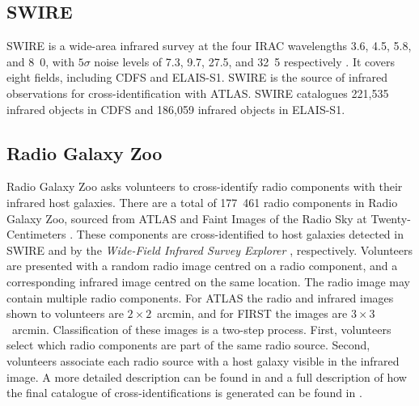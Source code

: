 \documentclass[fleqn,usenatbib,usedcolumn]{mnras}
\newcommand{\jansky}{\text{Jy}}
\begin{document}


  \subsection{SWIRE}\label{sec:swire}

    SWIRE \citep{lonsdale03swire, surace05swire} is a wide-area infrared
    survey at the four IRAC wavelengths 3.6, 4.5, 5.8, and
    \unit{8.0}{\micro\meter}, with $5\sigma$ noise levels of 7.3,
    9.7, 27.5, and \unit{32.5}{\micro\jansky} respectively
    \citep{lonsdale03swire}. It covers eight fields, including CDFS and ELAIS-S1. SWIRE is the source of infrared
    observations for cross-identification with ATLAS. SWIRE catalogues 221,535
    infrared objects in CDFS and 186,059 infrared objects in ELAIS-S1.

  \subsection{Radio Galaxy Zoo}\label{sec:rgz}

    Radio Galaxy Zoo asks volunteers to cross-identify radio components with
    their infrared host galaxies. There are a total of 177~461 radio
    components in Radio Galaxy Zoo, sourced from ATLAS and Faint Images of the
    Radio Sky at Twenty-Centimeters \citep[FIRST;][]{white97first}. These
    components are cross-identified to host galaxies detected in SWIRE and by
    the \emph{Wide-Field Infrared Survey Explorer}
    \citep[WISE;][]{wright10wise}, respectively. Volunteers are presented with
    a random radio image centred on a radio component, and a corresponding
    infrared image centred on the same location. The radio image may contain
    multiple radio components. For ATLAS the radio and infrared images shown
    to volunteers are $2 \times 2$~arcmin, and for FIRST the images are $3
    \times 3$~arcmin. Classification of these images is a two-step process.
    First, volunteers select which radio components are part of the same radio
    source. Second, volunteers associate each radio source with a host galaxy
    visible in the infrared image. A more detailed description can be found in
    \citet{banfield15} and a full description of how the final catalogue of
    cross-identifications is generated can be found in \citet{wong17}.
\end{document}
